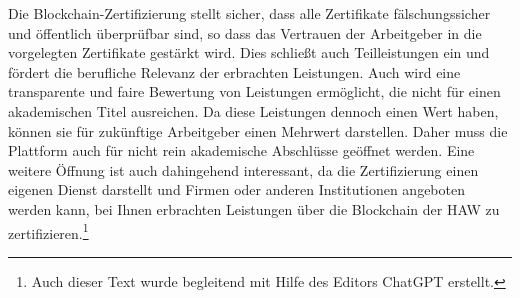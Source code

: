 \documentclass[conference]{IEEEtran}
\begin{document}
Die Blockchain-Zertifizierung stellt sicher, dass alle Zertifikate fälschungssicher und öffentlich überprüfbar sind, so dass  das Vertrauen der Arbeitgeber in die vorgelegten Zertifikate gestärkt wird. Dies schließt auch Teilleistungen ein und fördert die berufliche Relevanz der erbrachten Leistungen.
Auch wird eine transparente und faire Bewertung von Leistungen ermöglicht, die nicht für einen akademischen Titel ausreichen. Da diese Leistungen dennoch einen Wert  haben, können sie für zukünftige Arbeitgeber einen Mehrwert darstellen. Daher muss die Plattform auch für nicht rein akademische Abschlüsse geöffnet werden. Eine weitere Öffnung ist auch dahingehend interessant, da die Zertifizierung einen eigenen Dienst darstellt und Firmen oder anderen Institutionen angeboten werden kann, bei Ihnen erbrachten Leistungen über die Blockchain der HAW zu zertifizieren.\footnote{Auch dieser Text wurde begleitend mit Hilfe des Editors ChatGPT erstellt.}



\end{document}
